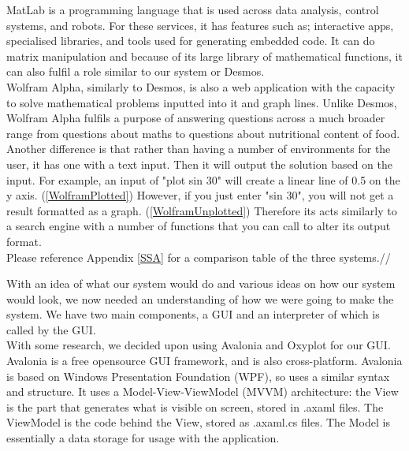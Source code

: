 \documentclass[a4paper, oneside, 11pt]{report}
\begin{document}
    MatLab is a programming language that is used across data analysis, control systems, and robots. For these services, it has features such as; interactive apps, specialised libraries, and tools used for generating embedded code. It can do matrix manipulation \citep{Matlab-Feat:2025} and because of its large library of mathematical functions, it can also fulfil a role similar to our system or Desmos. \\

    Wolfram Alpha, similarly to Desmos, is also a web application with the capacity to solve mathematical problems inputted into it and graph lines. Unlike Desmos, Wolfram Alpha fulfils a purpose of answering questions across a much broader range from questions about maths to questions about nutritional content of food. Another difference is that rather than having a number of environments for the user, it has one with a text input. Then it will output the solution based on the input. For example, an input of "plot sin 30" will create a linear line of 0.5 on the y axis. (\ref{WolframPlotted})
    However, if you just enter "sin 30", you will not get a result formatted as a graph. (\ref{WolframUnplotted})
    Therefore its acts similarly to a search engine with a number of functions that you can call to alter its output format. \\

    Please reference Appendix \ref{SSA} for a comparison table of the three systems.//

    With an idea of what our system would do and various ideas on how our system would look, we now needed an understanding of how we were going to make the system. We have two main components, a GUI and an interpreter of which is called by the GUI.\\
    With some research, we decided upon using Avalonia \cite{Avalonia:2025} and Oxyplot \cite{Oxyplot:2024} for our GUI. \\

    Avalonia is a free opensource GUI framework, and is also cross-platform. Avalonia is based on Windows Presentation Foundation (WPF), so uses a similar syntax and structure. It uses a Model-View-ViewModel (MVVM) architecture: the View is the part that generates what is visible on screen, stored in .axaml files. The ViewModel is the code behind the View, stored as .axaml.cs files. The Model is essentially a data storage for usage with the application.\newline \newline
\end{document}
